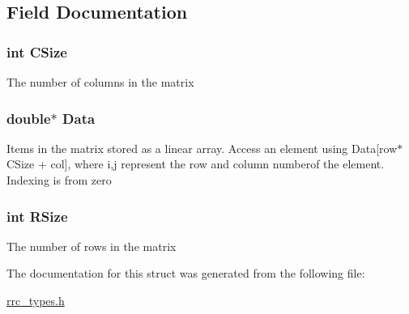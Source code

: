 \subsection{Field Documentation}
\hypertarget{struct_r_r_double_matrix_a17c9a5894aa9cb3789346dcaa9c370bb}{
\subsubsection[{C\-Size}]{\setlength{\rightskip}{0pt plus 5cm}int C\-Size}}\label{struct_r_r_double_matrix_a17c9a5894aa9cb3789346dcaa9c370bb}
The number of columns in the matrix \hypertarget{struct_r_r_double_matrix_a7c5cbda3aa940f4b0d6e8a1679307dfc}{
\subsubsection[{Data}]{\setlength{\rightskip}{0pt plus 5cm}double$\ast$ Data}}\label{struct_r_r_double_matrix_a7c5cbda3aa940f4b0d6e8a1679307dfc}
Items in the matrix stored as a linear array. Access an element using Data\mbox{[}row$\ast$\-C\-Size + col\mbox{]}, where i,j represent the row and column numberof the element. Indexing is from zero \hypertarget{struct_r_r_double_matrix_a4d8512c879223c0e0d1522dae38e7819}{
\subsubsection[{R\-Size}]{\setlength{\rightskip}{0pt plus 5cm}int R\-Size}}\label{struct_r_r_double_matrix_a4d8512c879223c0e0d1522dae38e7819}
The number of rows in the matrix 

The documentation for this struct was generated from the following file\-:\begin{DoxyCompactItemize}
\item 
\hyperlink{rrc__types_8h}{rrc\-\_\-types.\-h}\end{DoxyCompactItemize}

